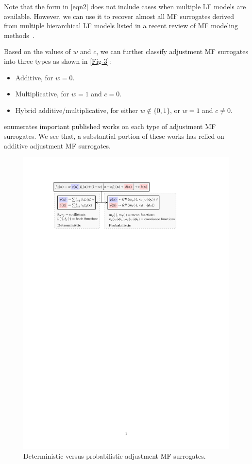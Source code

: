 \documentclass[iicol,sn-basic]{sn-jnl}%
\begin{document}
Note that the form in \cref{eqn2} does not include cases when multiple LF models are available.
However, we can use it to recover almost all MF surrogates derived from multiple hierarchical LF models listed in a recent review of MF modeling methods~\citep{FernandezGodino2016}.

Based on the values of $w$ and $c$, we can further classify adjustment MF surrogates into three types as shown in \cref{Fig-3}:
\begin{itemize}
	\item Additive, for $w=0$.
	
	\item Multiplicative, for $w=1$ and $c=0$.
	
	\item Hybrid additive/multiplicative, for either $w \notin \{0,1\}$, or $w=1$ and $c \neq 0$.
\end{itemize}

 enumerates important published works on each type of adjustment MF surrogates.
We see that, a substantial portion of these works has relied on additive adjustment MF surrogates. 

\begin{figure}
	\centering
	\includegraphics[scale=0.92]{Fig4.pdf}
	\caption{Deterministic versus probabilistic adjustment MF surrogates.}
	\label{Fig-4}
\end{figure}
\end{document}
